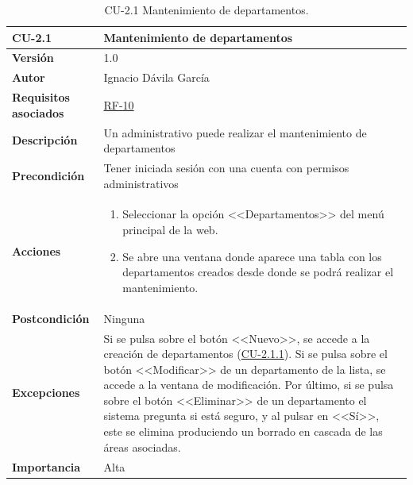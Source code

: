 \begin{table}[p]
\label{table:CU-2.1}
	\centering
	\begin{tabularx}{\linewidth}{ p{} p{} }
		\toprule
		\textbf{CU-2.1}    & \textbf{Mantenimiento de departamentos}\\
		\toprule
		\textbf{Versión}              & 1.0    \\
		\textbf{Autor}                & Ignacio Dávila García \\
		\textbf{Requisitos asociados} & \hyperref[itm:RF10]{RF-10} \\
		\textbf{Descripción}          & Un administrativo puede realizar el mantenimiento de departamentos \\
		\textbf{Precondición}         & Tener iniciada sesión con una cuenta con permisos administrativos \\
		\textbf{Acciones}             &
		\begin{enumerate}
			\def\labelenumi{\arabic{enumi}.}
			\tightlist
			\item Seleccionar la opción <<Departamentos>> del menú principal de la web.
			\item Se abre una ventana donde aparece una tabla con los departamentos creados desde donde se podrá realizar el mantenimiento.
		\end{enumerate}\\
		\textbf{Postcondición}        & Ninguna \\
		\textbf{Excepciones}          & Si se pulsa sobre el botón <<Nuevo>>, se accede a la creación de departamentos (\hyperref[table:CU-2.1.1]{CU-2.1.1}). Si se pulsa sobre el botón <<Modificar>> de un departamento de la lista, se accede a la ventana de modificación. Por último, si se pulsa sobre el botón <<Eliminar>> de un departamento el sistema pregunta si está seguro, y al pulsar en <<Sí>>, este se elimina produciendo un borrado en cascada de las áreas asociadas. \\
		\textbf{Importancia}          & Alta \\
		\bottomrule
	\end{tabularx}
	\caption{CU-2.1 Mantenimiento de departamentos.}
\end{table}
\FloatBarrier

